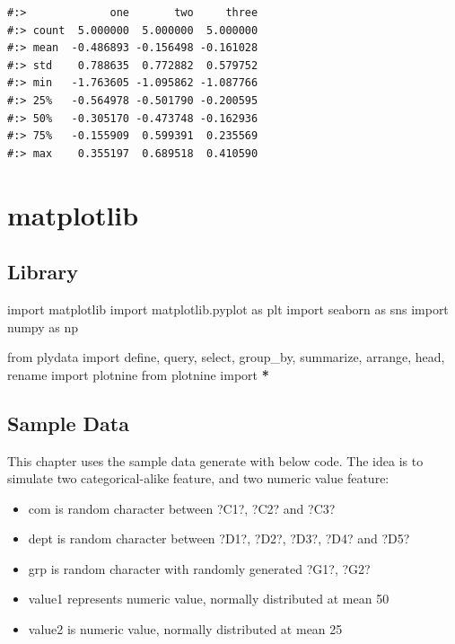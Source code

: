 \documentclass[
]{book}
\newenvironment{Shaded}{\begin{snugshade}}{\end{snugshade}}
\newcommand{\ImportTok}[1]{#1}
\newcommand{\NormalTok}[1]{#1}
\newcommand{\OperatorTok}[1]{\textcolor[rgb]{0.43,0.43,0.43}{\textbf{#1}}}
\providecommand{\tightlist}{%
  \setlength{\itemsep}{0pt}\setlength{\parskip}{0pt}}
\begin{document}
\begin{verbatim}
#:>             one       two     three
#:> count  5.000000  5.000000  5.000000
#:> mean  -0.486893 -0.156498 -0.161028
#:> std    0.788635  0.772882  0.579752
#:> min   -1.763605 -1.095862 -1.087766
#:> 25%   -0.564978 -0.501790 -0.200595
#:> 50%   -0.305170 -0.473748 -0.162936
#:> 75%   -0.155909  0.599391  0.235569
#:> max    0.355197  0.689518  0.410590
\end{verbatim}

\hypertarget{matplotlib-1}{%
\chapter{matplotlib}\label{matplotlib-1}}

\hypertarget{library}{%
\section{Library}\label{library}}

\begin{Shaded}
\begin{Highlighting}[]
\ImportTok{import}\NormalTok{ matplotlib}
\ImportTok{import}\NormalTok{ matplotlib.pyplot }\ImportTok{as}\NormalTok{ plt}
\ImportTok{import}\NormalTok{ seaborn }\ImportTok{as}\NormalTok{ sns}
\ImportTok{import}\NormalTok{ numpy }\ImportTok{as}\NormalTok{ np}

\ImportTok{from}\NormalTok{ plydata }\ImportTok{import}\NormalTok{ define, query, select, group_by, summarize, arrange, head, rename}
\ImportTok{import}\NormalTok{ plotnine}
\ImportTok{from}\NormalTok{ plotnine }\ImportTok{import} \OperatorTok{*}
\end{Highlighting}
\end{Shaded}

\hypertarget{sample-data-16}{%
\section{Sample Data}\label{sample-data-16}}

This chapter uses the sample data generate with below code. The idea is to simulate two categorical-alike feature, and two numeric value feature:

\begin{itemize}
\tightlist
\item
  com is random character between ?C1?, ?C2? and ?C3?\\
\item
  dept is random character between ?D1?, ?D2?, ?D3?, ?D4? and ?D5?\\
\item
  grp is random character with randomly generated ?G1?, ?G2?\\
\item
  value1 represents numeric value, normally distributed at mean 50\\
\item
  value2 is numeric value, normally distributed at mean 25
\end{itemize}
\end{document}

